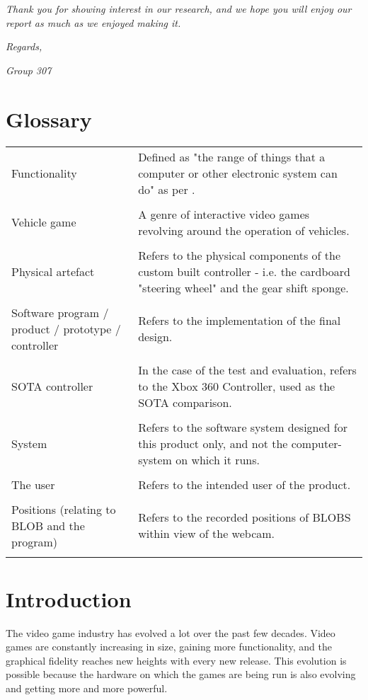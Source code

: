 \textit{Thank you for showing interest in our research, and we hope you will enjoy our report as much as we enjoyed making it.}
\bigskip

\noindent\textit{Regards,}

\noindent\textit{Group 307}

\clearpage

\section{Glossary}
\begin{table}[!htbp]
\begin{tabular}{p{2in} p{3.4in}}
Functionality & Defined as "the range of things that a computer or other electronic system can do" as per \parencite{Macmillan2005}.\\
&\\
Vehicle game & A genre of interactive video games revolving around the operation of vehicles.\\
 & \\
Physical artefact & Refers to the physical components of the custom built controller - i.e. the cardboard "steering wheel" and the gear shift sponge.\\
 & \\
Software program / product / prototype / controller & Refers to the implementation of the final design.\\
 & \\
SOTA controller & In the case of the test and evaluation, refers to the Xbox 360 Controller, used as the SOTA comparison.\\
 & \\
System & Refers to the software system designed for this product only, and not the computer-system on which it runs.\\
 & \\
The user & Refers to the intended user of the product.\\
 & \\
Positions (relating to BLOB and the program) & Refers to the recorded positions of BLOBS within view of the webcam.\\
 & \\
 
\end{tabular}
\end{table}

\clearpage

\section{Introduction}
The video game industry has evolved a lot over the past few decades. Video games are constantly increasing in size, gaining more functionality, and the graphical fidelity reaches new heights with every new release. This evolution is possible because the hardware on which the games are being run is also evolving and getting more and more powerful.
\bigskip

